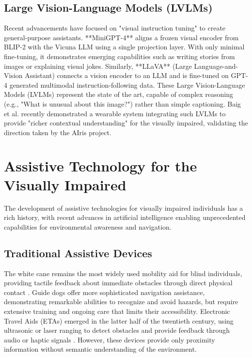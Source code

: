 \documentclass[12pt,a4paper]{report}
\begin{document}
\subsection{Large Vision-Language Models (LVLMs)}

Recent advancements have focused on "visual instruction tuning" to create general-purpose assistants. **MiniGPT-4** \cite{minigpt4} aligns a frozen visual encoder from BLIP-2 with the Vicuna LLM using a single projection layer. With only minimal fine-tuning, it demonstrates emerging capabilities such as writing stories from images or explaining visual jokes. Similarly, **LLaVA** (Large Language-and-Vision Assistant) \cite{llava} connects a vision encoder to an LLM and is fine-tuned on GPT-4 generated multimodal instruction-following data. These Large Vision-Language Models (LVLMs) represent the state of the art, capable of complex reasoning (e.g., "What is unusual about this image?") rather than simple captioning. Baig et al. \cite{baig2024} recently demonstrated a wearable system integrating such LVLMs to provide "richer contextual understanding" for the visually impaired, validating the direction taken by the AIris project.

\section{Assistive Technology for the Visually Impaired}

The development of assistive technologies for visually impaired individuals has a rich history, with recent advances in artificial intelligence enabling unprecedented capabilities for environmental awareness and navigation.

\subsection{Traditional Assistive Devices}

The white cane remains the most widely used mobility aid for blind individuals, providing tactile feedback about immediate obstacles through direct physical contact \cite{whitecane}. Guide dogs offer more sophisticated navigation assistance, demonstrating remarkable abilities to recognize and avoid hazards, but require extensive training and ongoing care that limits their accessibility. Electronic Travel Aids (ETAs) emerged in the latter half of the twentieth century, using ultrasonic or laser ranging to detect obstacles and provide feedback through audio or haptic signals \cite{eta}. However, these devices provide only proximity information without semantic understanding of the environment.
\end{document}
